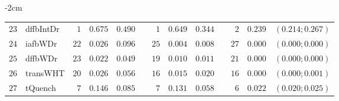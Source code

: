 \begin{table*}[!htbp]
\begin{adjustwidth*}{}{-2cm}
\begin{tabular}{@{}rlrrrrrrrrrcc@{}}
\footnotesize{$23$} & \footnotesize{dffbIntDr} & \footnotesize{$1 $} & \footnotesize{$0.675$} & \footnotesize{$0.490$} && \footnotesize{$1 $} & \footnotesize{$0.649$} & \footnotesize{$0.344$} && \footnotesize{$2 $} & \footnotesize{$0.239$} & \footnotesize{$(0.214;0.267)$} \\
\footnotesize{$24$} & \footnotesize{iafbWDr  } & \footnotesize{$22$} & \footnotesize{$0.026$} & \footnotesize{$0.096$} && \footnotesize{$25$} & \footnotesize{$0.004$} & \footnotesize{$0.008$} && \footnotesize{$27$} & \footnotesize{$0.000$} & \footnotesize{$(0.000;0.000)$} \\
\footnotesize{$25$} & \footnotesize{dffbWDr  } & \footnotesize{$23$} & \footnotesize{$0.022$} & \footnotesize{$0.049$} && \footnotesize{$19$} & \footnotesize{$0.010$} & \footnotesize{$0.011$} && \footnotesize{$21$} & \footnotesize{$0.000$} & \footnotesize{$(0.000;0.000)$} \\
\footnotesize{$26$} & \footnotesize{transWHT } & \footnotesize{$20$} & \footnotesize{$0.026$} & \footnotesize{$0.056$} && \footnotesize{$16$} & \footnotesize{$0.015$} & \footnotesize{$0.020$} && \footnotesize{$16$} & \footnotesize{$0.000$} & \footnotesize{$(0.000;0.001)$} \\
\footnotesize{$27$} & \footnotesize{tQuench  } & \footnotesize{$7 $} & \footnotesize{$0.146$} & \footnotesize{$0.085$} && \footnotesize{$7 $} & \footnotesize{$0.131$} & \footnotesize{$0.058$} && \footnotesize{$6 $} & \footnotesize{$0.022$} & \footnotesize{$(0.020;0.025)$} \\
\bottomrule
\end{tabular}
\end{adjustwidth*}
\end{table*}

